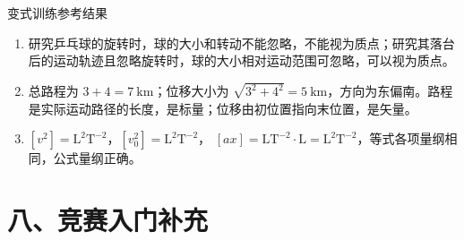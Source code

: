 \begin{learningbox}{变式训练参考结果}
\begin{enumerate}[itemsep=0.45em,topsep=0.3em,parsep=0pt]
  \item 研究乒乓球的旋转时，球的大小和转动不能忽略，不能视为质点；研究其落台后的运动轨迹且忽略旋转时，球的大小相对运动范围可忽略，可以视为质点。
  \item 总路程为 $3+4=7\ \mathrm{km}$；位移大小为
  $\sqrt{3^2+4^2}=5\ \mathrm{km}$，方向为东偏南。路程是实际运动路径的长度，是标量；位移由初位置指向末位置，是矢量。
  \item $[v^2]=\mathrm{L^2T^{-2}}$，$[v_0^2]=\mathrm{L^2T^{-2}}$，
  $[ax]=\mathrm{LT^{-2}}\cdot\mathrm L=\mathrm{L^2T^{-2}}$，等式各项量纲相同，公式量纲正确。
\end{enumerate}
\end{learningbox}

\section*{八、竞赛入门补充}

